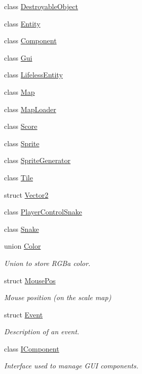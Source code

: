 \begin{DoxyCompactItemize}
class \hyperlink{classarcade_1_1_destroyable_object}{Destroyable\-Object}
\item 
class \hyperlink{classarcade_1_1_entity}{Entity}
\item 
class \hyperlink{classarcade_1_1_component}{Component}
\item 
class \hyperlink{classarcade_1_1_gui}{Gui}
\item 
class \hyperlink{classarcade_1_1_lifeless_entity}{Lifeless\-Entity}
\item 
class \hyperlink{classarcade_1_1_map}{Map}
\item 
class \hyperlink{classarcade_1_1_map_loader}{Map\-Loader}
\item 
class \hyperlink{classarcade_1_1_score}{Score}
\item 
class \hyperlink{classarcade_1_1_sprite}{Sprite}
\item 
class \hyperlink{classarcade_1_1_sprite_generator}{Sprite\-Generator}
\item 
class \hyperlink{classarcade_1_1_tile}{Tile}
\item 
struct \hyperlink{structarcade_1_1_vector2}{Vector2}
\item 
class \hyperlink{classarcade_1_1_player_control_snake}{Player\-Control\-Snake}
\item 
class \hyperlink{classarcade_1_1_snake}{Snake}
\item 
union \hyperlink{unionarcade_1_1_color}{Color}
\begin{DoxyCompactList}\small\item\em Union to store R\-G\-Ba color. \end{DoxyCompactList}\item 
struct \hyperlink{structarcade_1_1_mouse_pos}{Mouse\-Pos}
\begin{DoxyCompactList}\small\item\em Mouse position (on the scale map) \end{DoxyCompactList}\item 
struct \hyperlink{structarcade_1_1_event}{Event}
\begin{DoxyCompactList}\small\item\em Description of an event. \end{DoxyCompactList}\item 
class \hyperlink{classarcade_1_1_i_component}{I\-Component}
\begin{DoxyCompactList}\small\item\em Interface used to manage G\-U\-I components. \end{DoxyCompactList}\item 

\end{DoxyCompactItemize}
